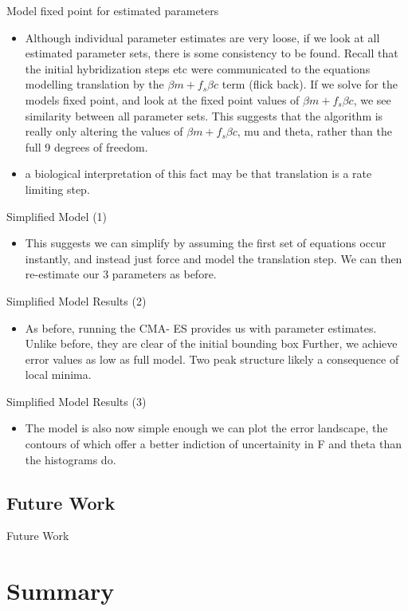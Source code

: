 \documentclass[8pt]{beamer}
\begin{document}
\begin{frame}{Model fixed point for estimated parameters}
\begin{itemize}
	\item Although individual parameter estimates are very loose, if we look at all estimated parameter sets, there is some consistency to be found. Recall that the initial hybridization steps etc were communicated to the equations modelling translation by the ${\beta} m +{f_{s}}\beta c$ term (flick back). If we solve for the models fixed point, and look at the fixed point values of ${\beta} m +{f_{s}}\beta c$, we see similarity between all parameter sets. This suggests that the algorithm is really only altering the values of ${\beta} m +{f_{s}}\beta c$, mu and theta, rather than the full 9 degrees of freedom.
	\item a biological interpretation of this fact may be that translation is a rate limiting step. 
\end{itemize}
\end{frame}


\begin{frame}{Simplified Model (1)}
\begin{itemize}
\item This suggests we can simplify by assuming the first set of equations occur instantly, and instead just force and model the translation step. We can then re-estimate our 3 parameters as before.
\end{itemize}
\end{frame}


\begin{frame}{Simplified Model Results (2)}
  \begin{itemize}
\item As before, running the CMA- ES provides us with parameter estimates. Unlike before, they are clear of the initial bounding box Further, we achieve error values as low as full model. Two peak structure likely a consequence of local minima.
\end{itemize}
\end{frame}

\begin{frame}{Simplified Model Results (3)}
  \begin{itemize}
\item The model is also now simple enough we can plot the error landscape, the contours of which offer a better indiction of uncertainity in F and theta than the histograms do.
\end{itemize}
\end{frame}

\subsection{Future Work}


\begin{frame}{Future Work}
  
  \end{frame}
  
  \section*{Summary}
\end{document}
